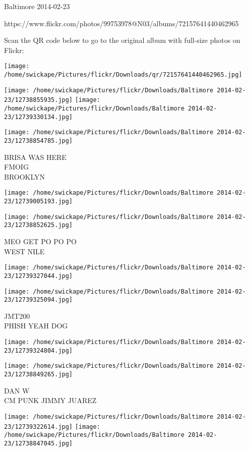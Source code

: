 \documentclass[10pt,letterpaper]{article}
\begin{document}
Baltimore 2014-02-23

https://www.flickr.com/photos/99753978@N03/albums/72157641440462965

Scan the QR code below to go to the original album with full-size photos on Flickr:

\texttt{[image: /home/swickape/Pictures/flickr/Downloads/qr/72157641440462965.jpg]}
\pagebreak

\texttt{[image: /home/swickape/Pictures/flickr/Downloads/Baltimore 2014-02-23/12738855935.jpg]}
\texttt{[image: /home/swickape/Pictures/flickr/Downloads/Baltimore 2014-02-23/12739330134.jpg]}

\texttt{[image: /home/swickape/Pictures/flickr/Downloads/Baltimore 2014-02-23/12738854785.jpg]}

BRISA WAS HERE\\
FMOIG\\
BROOKLYN
\pagebreak

\texttt{[image: /home/swickape/Pictures/flickr/Downloads/Baltimore 2014-02-23/12739005193.jpg]}

\vspace{0.25in}
\texttt{[image: /home/swickape/Pictures/flickr/Downloads/Baltimore 2014-02-23/12738852625.jpg]}

MEO GET PO PO PO\\
WEST NILE
\pagebreak

\texttt{[image: /home/swickape/Pictures/flickr/Downloads/Baltimore 2014-02-23/12739327044.jpg]}

\vspace{0.25in}
\texttt{[image: /home/swickape/Pictures/flickr/Downloads/Baltimore 2014-02-23/12739325094.jpg]}

JMT200\\
PHISH YEAH DOG
\pagebreak

\texttt{[image: /home/swickape/Pictures/flickr/Downloads/Baltimore 2014-02-23/12739324804.jpg]}

\vspace{0.25in}
\texttt{[image: /home/swickape/Pictures/flickr/Downloads/Baltimore 2014-02-23/12738849265.jpg]}

DAN W\\
CM PUNK JIMMY JUAREZ
\pagebreak

\texttt{[image: /home/swickape/Pictures/flickr/Downloads/Baltimore 2014-02-23/12739322614.jpg]}
\texttt{[image: /home/swickape/Pictures/flickr/Downloads/Baltimore 2014-02-23/12738847045.jpg]}
\end{document}
